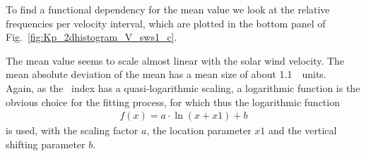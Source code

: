 To find a functional dependency for the mean \Kp{} value we look at the relative frequencies per velocity interval, which are plotted in the bottom panel of Fig.~\ref{fig:Kp_2dhistogram_V_sws1_c}.
\begin{figure}
\end{figure}
The mean \Kp{} value seems to scale almost linear with the solar wind velocity. The mean absolute deviation of the mean has a mean size of about \SI{1.1}{\Kp~units}.\\

Again, as the \Kp~index has a quasi-logarithmic scaling, a logarithmic function is the obvious choice for the fitting process, for which thus the logarithmic function
\begin{align}
	f(x) = a \cdot \ln(x + x1) + b	\label{eq:log_offset_fit_function}
\end{align}
is used, with the scaling factor $a$, the location parameter $x1$ and the vertical shifting parameter $b$.\\

